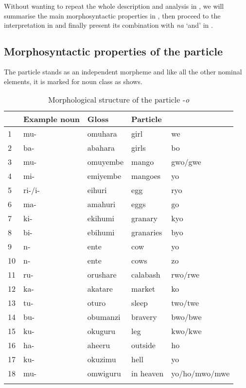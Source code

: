 \documentclass[output=paper]{langscibook}
\begin{document}
\z

Without wanting to repeat the whole description and analysis in \citet{AsiimwevanderWal2021}, we will summarise the main morphosyntactic properties in , then proceed to the interpretation in  and finally present its combination with \textit{na} ‘and’ in .

\subsection{Morphosyntactic properties of the particle}
\label{bkm:Ref135664271}

The particle stands as an independent morpheme and like all the other nominal elements, it is marked for noun class as  shows.

\begin{table}[h]
\begin{tabular}{l@{~}llll}
\lsptoprule
\multicolumn{2}{l}{Noun class\,+\,prefix} & Example noun & Gloss & Particle\\
\midrule
1  & mu- & omuhara & girl & we\\
2  & ba- & abahara & girls & bo\\
3  & mu- & omuyembe & mango & gwo/gwe\\
4  & mi- & emiyembe & mangoes & yo\\
5  & ri-/i- & eihuri & egg & ryo\\
6  & ma- & amahuri & eggs & go\\
7  & ki- & ekihumi & granary & kyo\\
8  & bi- & ebihumi & granaries & byo\\
9  & n- & ente & cow & yo\\
10 & n- & ente & cows & zo\\
11 & ru- & orushare & calabash & rwo/rwe\\
12 & ka- & akatare & market & ko\\
13 & tu- & oturo & sleep & two/twe\\
14 & bu- & obumanzi & bravery & bwo/bwe\\
15 & ku- & okuguru & leg & kwo/kwe\\
16 & ha- & aheeru & outside & ho\\
17 & ku- & okuzimu & hell & yo\\
18 & mu- & omwiguru & in heaven & yo/ho/mwo/mwe\\
\lspbottomrule
\end{tabular}
\caption{Morphological structure of the particle -\textit{o} \citep[4]{AsiimwevanderWal2021}}
\label{tab:nyn-morph-o}
\end{table}
\end{document}
